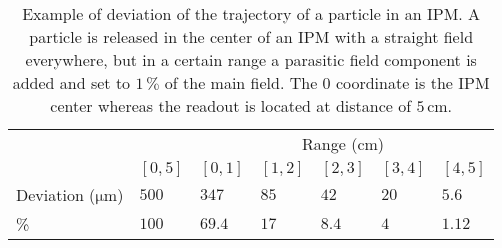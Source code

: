 \begin{table}[ht]
  \centering
  \caption[Example of deviation of the trajectory of a particle in an IPM]
  {Example of deviation of the trajectory of a particle in an IPM. A particle is released in the center of an IPM with a straight field everywhere, but in a certain range a parasitic field component is added and set to $1\,\mathrm{\%}$ of the main field. The 0 coordinate is the IPM center whereas the readout is located at distance of \(5 \, \mathrm{cm}\).}
  \label{chap3:Deviation}
  \begin{tabularx}{\linewidth}{lXXXXXX}
    \toprule
                                   &           & \multicolumn{5}{c}{Range (\(\mathrm{cm}\))}                                                 \\
    \cmidrule(lr){3-7}
                                   & \([0,5]\) & \([0,1]\)                                   & \([1,2]\) & \([2,3]\) & \([3,4]\) & \([4,5]\) \\
    \midrule
    Deviation (\(\mathrm{\mu m}\)) & \(500\)   & \(347\)                                     & \(85\)    & \(42\)    & \(20\)    & \(5.6\)   \\
    \%                             & $100$     & $69.4$                                      & $17$      & $8.4$     & $4$       & $1.12$    \\
    \bottomrule
  \end{tabularx}
\end{table}
